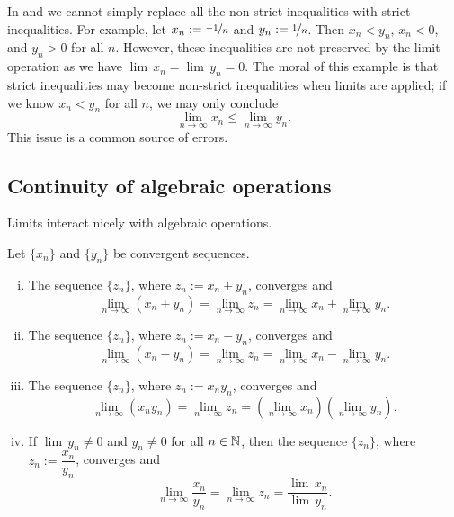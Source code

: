 In  and  we cannot simply replace
all the non-strict inequalities with
strict inequalities.  For example,
let $x_n := \nicefrac{-1}{n}$ and $y_n := \nicefrac{1}{n}$.
Then $x_n < y_n$, $x_n < 0$,
and $y_n > 0$ for all $n$.  However, these inequalities are
not preserved by the limit operation as we have
$\lim\, x_n = \lim\, y_n = 0$.
The moral of this example is that strict inequalities may become non-strict
inequalities when limits are applied; if we know
$x_n < y_n$ for all $n$,
we may only conclude 
\begin{equation*}
\lim_{n \to \infty} x_n \leq
\lim_{n \to \infty} y_n .
\end{equation*}
This issue is a common source of errors.

\subsection{Continuity of algebraic operations}

Limits interact nicely with algebraic operations.

\begin{prop} \label{prop:contalg}
Let $\{ x_n \}$ and $\{ y_n \}$ be convergent sequences.
\begin{enumerate}[(i)]
\item \label{prop:contalg:i}
The sequence $\{ z_n \}$, where $z_n := x_n + y_n$, converges and
\begin{equation*}
\lim_{n \to \infty} (x_n + y_n) = 
\lim_{n \to \infty} z_n = 
\lim_{n \to \infty} x_n + 
\lim_{n \to \infty} y_n .
\end{equation*}
\item \label{prop:contalg:ii}
The sequence $\{ z_n \}$, where $z_n := x_n - y_n$, converges and
\begin{equation*}
\lim_{n \to \infty} (x_n - y_n) = 
\lim_{n \to \infty} z_n = 
\lim_{n \to \infty} x_n - 
\lim_{n \to \infty} y_n .
\end{equation*}
\item \label{prop:contalg:iii}
The sequence $\{ z_n \}$, where $z_n := x_n y_n$, converges and
\begin{equation*}
\lim_{n \to \infty} (x_n y_n) = 
\lim_{n \to \infty} z_n = 
\left( \lim_{n \to \infty} x_n \right)
\left( \lim_{n \to \infty} y_n \right) .
\end{equation*}
\item \label{prop:contalg:iv}
If $\lim\, y_n \not= 0$ and $y_n \not= 0$ for all $n \in {\mathbb{N}}$, then
the sequence $\{ z_n \}$, where $z_n := \dfrac{x_n}{y_n}$, converges and
\begin{equation*}
\lim_{n \to \infty} \frac{x_n}{y_n} = 
\lim_{n \to \infty} z_n = 
\frac{\lim\, x_n}{\lim\, y_n} .
\end{equation*}
\end{enumerate}
\end{prop}

